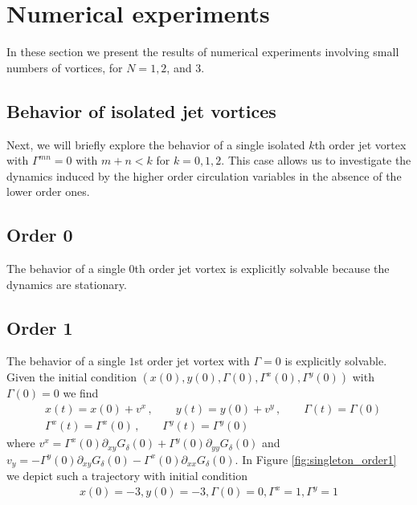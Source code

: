 \documentclass[12pt]{amsart}
\theoremstyle{remark}
\begin{document}
\section{Numerical experiments}
\label{sec:numerical_experiments}
In these section we present the results of numerical experiments involving small numbers of vortices, for $N=1,2$, and $3$.

\subsection{Behavior of isolated jet vortices}
\label{sec:singles}
Next, we will briefly explore the behavior of a single isolated $k$th order jet vortex with $\Gamma^{mn} = 0$ with $m+n < k$ for $k=0,1,2$.
This case allows us to investigate the dynamics induced by the higher order circulation variables
in the absence of the lower order ones.

\subsection{Order 0}
The behavior of a single $0$th order jet vortex is explicitly solvable because the dynamics are stationary.

\subsection{Order 1}  
The behavior of a single $1$st order jet vortex with $\Gamma= 0$ is explicitly solvable.
Given the initial condition $(x(0) , y(0) ,  \Gamma (0) , \Gamma^x(0) , \Gamma^y(0) )$ with $\Gamma(0) = 0$ we find
\begin{align*}
	&x(t) = x(0) + v^x \,,\quad \quad y(t) = y(0) + v^y \,,\quad \quad \Gamma(t) = \Gamma(0) \\
	&\Gamma^x(t) = \Gamma^x(0)\,,\quad \quad \Gamma^y(t) = \Gamma^y(0)
\end{align*}
where $v^x = \Gamma^x(0) \partial_{xy}G_\delta(0) + \Gamma^y(0) \partial_{yy}G_\delta(0)$
and $v_y =  -\Gamma^y(0) \partial_{xy}G_\delta(0) - \Gamma^x(0) \partial_{xx}G_\delta(0)$.
In Figure \ref{fig:singleton_order1}
we depict such a trajectory with initial condition
\begin{align}
	x(0) = -3 , y(0) = -3 , \Gamma(0) = 0 , \Gamma^x = 1, \Gamma^y = 1 \label{eq:ic_order1}
\end{align}
\end{document}

